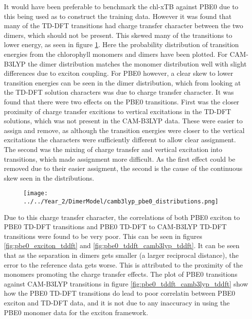 It would have been preferable to benchmark the chl-xTB against PBE0 due to this
being used as to construct the training data. However it was found that many of 
the TD-DFT transitions had charge transfer character between the two dimers, which
should not be present. This skewed many of the transitions to lower energy, as seen
in figure \ref{fig:camb3lyp_pbe0_distributions}.
Here the probability distribution of transition energies from the chlorophyll monomers
and dimers have been plotted. For CAM-B3LYP the dimer distribution matches the
monomer distribution well with slight differences due to exciton coupling. For PBE0
however, a clear skew to lower transition energies can be seen in the dimer distribution,
which from looking at the TD-DFT solution characters was due to charge transfer 
character. It was found that there were two effects on the PBE0 transitions. First
was the closer proximity of charge transfer excitions to vertical excitations in
the TD-DFT solutions, which was not present in the CAM-B3LYP data. These were easier
to assign and remove, as although the transition energies were closer to the vertical
excitations the characters were sufficiently different to allow clear assignment.
The second was the mixing of charge transfer and vertical excitation into transitions,
which made assignment more difficult. As the first effect could be removed due to
their easier assigment, the second is the cause of the continuous skew seen in the
distributions.

\begin{figure}
    \centering
    \texttt{[image: ../../Year\_2/DimerModel/camb3lyp\_pbe0\_distributions.png]}
    \label{fig:camb3lyp_pbe0_distributions}
\end{figure}

\afterpartskip

Due to this charge transfer character, the correlations of both PBE0 exciton to
PBE0 TD-DFT transitions and PBE0 TD-DFT to CAM-B3LYP TD-DFT transitions were found
to be very poor. This can be seen in figures \ref{fig:pbe0_exciton_tddft} and \ref{fig:pbe0_tddft_camb3lyp_tddft}.
It can be seen that as the separation in dimers gets smaller (a larger reciprocal
distance), the error to the reference data gets worse. This is attributed to the
proximity of the monomers promoting the charge transfer effects. The plot of PBE0
transitions against CAM-B3LYP transitions in figure \ref{fig:pbe0_tddft_camb3lyp_tddft}
show how the PBE0 TD-DFT transitions do lead to poor correlatin between PBE0 exciton
and TD-DFT data, and it is not due to any inaccuracy in using the PBE0 monomer data
for the exciton framework.


